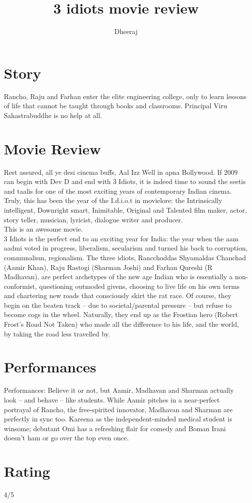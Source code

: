 \documentclass[a4paper,10pt]{article}
\title{3 idiots movie review}
\author{Dheeraj}
\begin{document}
\maketitle

\section{Story}
 Rancho, Raju and Farhan enter the elite engineering college, only to learn lessons of life that cannot be taught through books and classrooms. Principal Viru Sahastrabuddhe is no help at all.

\section{Movie Review}
Rest assured, all ye desi cinema buffs, Aal Izz Well in apna Bollywood. If 2009 can begin with Dev D and end with 3 Idiots, it is indeed time to sound the seetis and taalis for one of the most exciting years of contemporary Indian cinema. Truly, this has been the year of the I.d.i.o.t in movielore: the Intrinsically intelligent, Downright smart, Inimitable, Original and Talented film maker, actor, story teller, musician, lyricist, dialogue writer and producer.\\

This is an awesome movie.\\

3 Idiots is the perfect end to an exciting year for India: the year when the aam aadmi voted in progress, liberalism, secularism and turned his back to corruption, communalism, regionalism. The three idiots, Rancchoddas Shyamaldas Chanchad (Aamir Khan), Raju Rastogi (Sharman Joshi) and Farhan Qureshi (R Madhavan), are perfect archetypes of the new age Indian who is essentially a non-conformist, questioning outmoded givens, choosing to live life on his own terms and chartering new roads that consciously skirt the rat race. Of course, they begin on the beaten track -- due to societal/parental pressure -- but refuse to become cogs in the wheel. Naturally, they end up as the Frostian hero (Robert Frost's Road Not Taken) who made all the difference to his life, and the world, by taking the road less travelled by.

\section{Performances}
Performances: Believe it or not, but Aamir, Madhavan and Sharman actually look -- and behave -- like students. While Aamir pitches in a near-perfect portrayal of Rancho, the free-spirited innovator, Madhavan and Sharman are perfectly in sync too. Kareena as the independent-minded medical student is winsome; debutant Omi has a refreshing flair for comedy and Boman Irani doesn't ham or go over the top even once.

\section{Rating}
4/5
\end{document}
